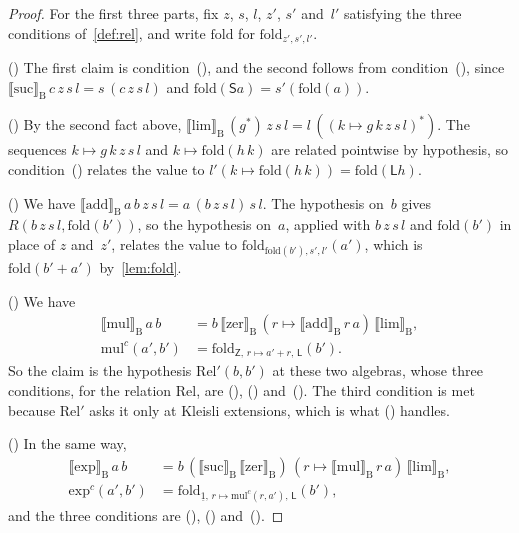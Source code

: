 \documentclass[11pt]{amsart}
\newcommand{\Dial}{\mathrm{B}}
\newcommand{\dsem}[1]{\llbracket #1 \rrbracket_{\Dial}}
\newcommand{\kext}[1]{#1^{*}}                %
\newcommand{\bZ}{\mathsf{Z}}
\newcommand{\bS}{\mathsf{S}}
\newcommand{\bL}{\mathsf{L}}
\newcommand{\bplus}{\mathbin{+}}
\newcommand{\num}[1]{\underline{#1}}          %
\theoremstyle{plain}
\theoremstyle{definition}
\begin{document}
\begin{proof}
For the first three parts, fix $z$, $s$, $l$, $z'$, $s'$ and~$l'$
satisfying the three conditions of~\cref{def:rel}, and write
$\mathrm{fold}$ for $\mathrm{fold}_{z',s',l'}$.

() The first claim is
condition~(), and the second follows from
condition~(), since
$\dsem{\mathrm{suc}}\,c\,z\,s\,l = s\,(c\,z\,s\,l)$ and
$\mathrm{fold}(\bS a) = s'(\mathrm{fold}(a))$.

() By the second fact above,
$\dsem{\mathrm{lim}}\,(\kext g)\,z\,s\,l
 = l\,(\kext{(k \mapsto g\,k\,z\,s\,l)})$. The sequences
$k \mapsto g\,k\,z\,s\,l$ and $k \mapsto \mathrm{fold}(h\,k)$ are
related pointwise by hypothesis, so
condition~() relates the value to
$l'(k \mapsto \mathrm{fold}(h\,k)) = \mathrm{fold}(\bL h)$.

() We have
$\dsem{\mathrm{add}}\,a\,b\,z\,s\,l = a\,(b\,z\,s\,l)\,s\,l$. The
hypothesis on~$b$ gives $R(b\,z\,s\,l, \mathrm{fold}(b'))$, so the
hypothesis on~$a$, applied with $b\,z\,s\,l$ and $\mathrm{fold}(b')$
in place of $z$ and~$z'$, relates the value to
$\mathrm{fold}_{\mathrm{fold}(b'),s',l'}(a')$, which is
$\mathrm{fold}(b' \bplus a')$ by~\cref{lem:fold}.

() We have
\begin{align*}
  \dsem{\mathrm{mul}}\,a\,b &= b\,\dsem{\mathrm{zer}}\,
    (r \mapsto \dsem{\mathrm{add}}\,r\,a)\,\dsem{\mathrm{lim}} , \\
  \mathrm{mul}^{c}(a', b')
    &= \mathrm{fold}_{\bZ,\, r \mapsto a' \bplus r,\, \bL}(b') .
\end{align*}
So the claim is the hypothesis $\mathrm{Rel}'(b, b')$
at these two algebras, whose three conditions, for the relation
$\mathrm{Rel}$, are (), ()
and~(). The third condition is met because
$\mathrm{Rel}'$ asks it only at Kleisli extensions, which is what
() handles.

() In the same way,
\begin{align*}
  \dsem{\mathrm{exp}}\,a\,b &= b\,(\dsem{\mathrm{suc}}\,
    \dsem{\mathrm{zer}})\,(r \mapsto \dsem{\mathrm{mul}}\,r\,a)\,
    \dsem{\mathrm{lim}} , \\
  \mathrm{exp}^{c}(a', b')
    &= \mathrm{fold}_{\num 1,\, r \mapsto \mathrm{mul}^{c}(r, a'),\,
      \bL}(b') ,
\end{align*}
and the three conditions are
(), ()
and~().


\end{proof}
\end{document}
